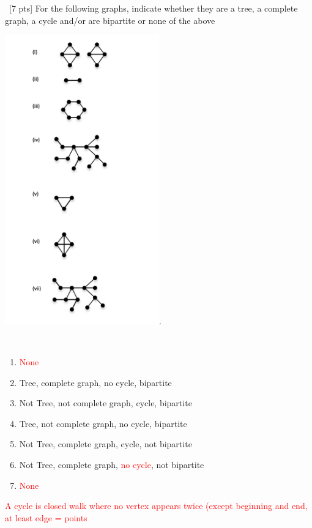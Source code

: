 \documentclass[12pt]{article}
\newenvironment{sol}[1][Solution]{\begin{trivlist}\item[\hskip\labelsep {\bfseries #1:}]}{\end{trivlist}}
\begin{document}
\begin{enumerate}
    \item \ [7 pts] For the following graphs, indicate whether they are a tree, a complete graph, a cycle and/or are bipartite or none of the above
    \begin{center}
        \includegraphics[width=0.5\textwidth]{p2.png}.
    \end{center}
    \begin{sol}
    \hspace*{\fill}\\
        \begin{enumerate}[i]
            \item \textcolor{red}{None}
            \item Tree, complete graph, no cycle, bipartite
            \item Not Tree, not complete graph, cycle, bipartite
            \item Tree, not complete graph, no cycle, bipartite
            \item Not Tree, complete graph, cycle, not bipartite
            \item Not Tree, complete graph, \textcolor{red}{no cycle}, not bipartite
            \item \textcolor{red}{None}
        \end{enumerate}
            \textcolor{red}{A cycle is closed walk where no vertex appears twice (except beginning and end, at least edge = points}
    \end{sol}


\end{enumerate}
\end{document}
